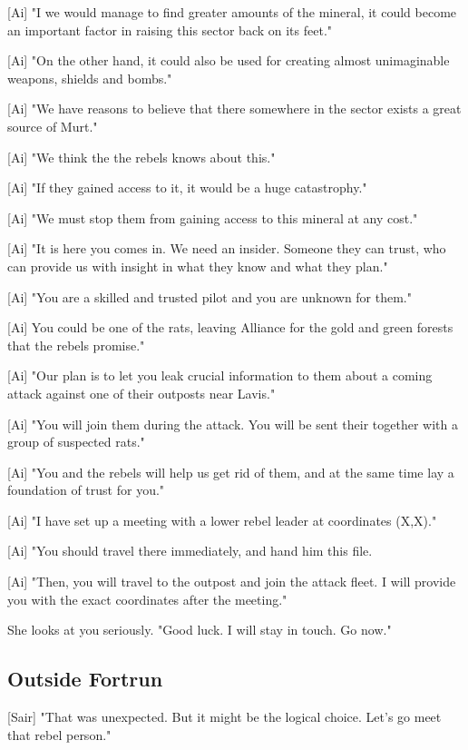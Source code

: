 \documentclass[a4paper,12pt]{article}
\begin{document}
[Ai] "I we would manage to find greater amounts of the mineral, it could become an important
factor in raising this sector back on its feet."

[Ai] "On the other hand, it could also be used for creating almost unimaginable weapons, shields
and bombs."

[Ai] "We have reasons to believe that there somewhere in the sector exists a great source of Murt." 

[Ai] "We think the the rebels knows about this." 

[Ai] "If they gained access to it, it would be a huge catastrophy." 

[Ai] "We must stop them from gaining access to this mineral at any cost."

[Ai] "It is here you comes in. We need an insider. Someone they can trust, who can
provide us with insight in what they know and what they plan."

[Ai] "You are a skilled and trusted pilot and you are unknown for them." 

[Ai] You could be one of the rats, leaving Alliance for the gold and green forests that the rebels promise."

[Ai] "Our plan is to let you leak crucial information to them about a coming attack against
one of their outposts near Lavis." 

[Ai] "You will join them during the attack. You will be sent their together with a group of suspected
rats." 

[Ai] "You and the rebels will help us get rid of them, and at the same time
lay a foundation of trust for you."

[Ai] "I have set up a meeting with a lower rebel leader at coordinates (X,X)." 

[Ai] "You should travel there immediately, and hand him this file. 

[Ai] "Then, you will travel to the outpost and join the attack fleet. I will provide you with the exact coordinates
after the meeting."

She looks at you seriously. "Good luck. I will stay in touch. Go now."

\subsection{Outside Fortrun}

[Sair] "That was unexpected. But it might be the logical choice. Let's go meet that rebel person."
\end{document}
